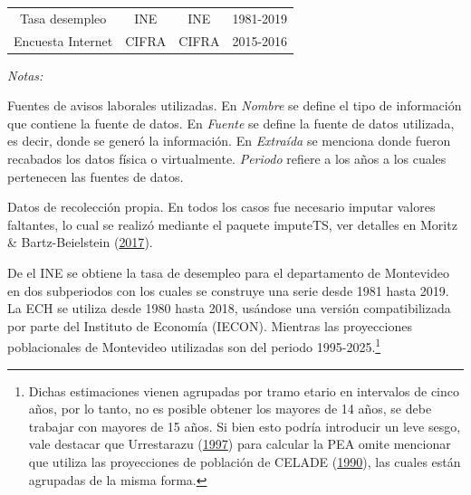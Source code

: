 \documentclass[12pt,oneside]{reedthesis}
\begin{document}
\begin{table}[!h]
\begin{threeparttable}
\begin{tabular}[t]{cccc}
Tasa desempleo & INE & INE & 1981-2019\\
Encuesta Internet & CIFRA & CIFRA & 2015-2016\\
\bottomrule
\end{tabular}
\begin{tablenotes}
\item \textit{Notas:} 
\item \footnotesize Fuentes de avisos laborales utilizadas. En \textit{Nombre} se define el tipo de información que contiene la fuente de datos. En \textit{Fuente} se define la fuente de datos utilizada, es decir, donde se generó la información. En \textit{Extraída} se menciona donde fueron recabados los datos física o virtualmente. \textit{Periodo} refiere a los años a los cuales pertenecen las fuentes de datos.
\item[1] Datos de recolección propia. En todos los casos fue necesario imputar valores faltantes, lo cual se realizó mediante el paquete imputeTS, ver detalles en Moritz \& Bartz-Beielstein (\protect\hyperlink{ref-Moritz2017}{2017}).
\end{tablenotes}
\end{threeparttable}
\end{table}




De el INE se obtiene la tasa de desempleo para el departamento de Montevideo en dos subperiodos con los cuales se construye una serie desde 1981 hasta 2019. La ECH se utiliza desde 1980 hasta 2018, usándose una versión compatibilizada por parte del Instituto de Economía (IECON). Mientras las proyecciones poblacionales de Montevideo utilizadas son del periodo 1995-2025.\footnote{Dichas estimaciones vienen agrupadas por tramo etario en intervalos de cinco años, por lo tanto, no es posible obtener los mayores de 14 años, se debe trabajar con mayores de 15 años. Si bien esto podría introducir un leve sesgo, vale destacar que Urrestarazu (\protect\hyperlink{ref-Urrestarazu1997}{1997}) para calcular la PEA omite mencionar que utiliza las proyecciones de población de CELADE (\protect\hyperlink{ref-Celade1990}{1990}), las cuales están agrupadas de la misma forma.}
\end{document}
